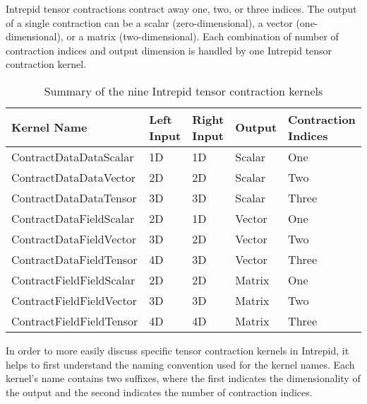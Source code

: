Intrepid tensor contractions contract away one, two, or three indices.  The
output of a single contraction can be a scalar (zero-dimensional), a vector
(one-dimensional), or a matrix (two-dimensional).  Each combination of number of
contraction indices and output dimension is handled by one Intrepid tensor
contraction kernel.

\begin{table}[ht]
        \begin{tabular} {| l | l | l | l |l |}
            \hline
            \textbf{Kernel Name} & \textbf{Left Input} & \textbf{Right Input} &
            \textbf{Output} & \textbf{Contraction Indices}\\
            \hline
            ContractDataDataScalar   & 1D & 1D & Scalar & One \\
            ContractDataDataVector   & 2D & 2D & Scalar & Two \\
            ContractDataDataTensor   & 3D & 3D & Scalar & Three \\
            ContractDataFieldScalar  & 2D & 1D & Vector & One \\
            ContractDataFieldVector  & 3D & 2D & Vector & Two \\
            ContractDataFieldTensor  & 4D & 3D & Vector & Three \\
            ContractFieldFieldScalar & 2D & 2D & Matrix & One \\
            ContractFieldFieldVector & 3D & 3D & Matrix & Two \\
            ContractFieldFieldTensor & 4D & 4D & Matrix & Three \\
            \hline
        \end{tabular}
\caption{Summary of the nine Intrepid tensor contraction kernels
\label{tab:IntrepidContractionSummary}}
\end{table}

In order to more easily discuss specific tensor contraction kernels in Intrepid,
it helps to first understand the naming convention used for the kernel names.
Each kernel's name contains two suffixes, where the first indicates the
dimensionality of the output and the second indicates the number of contraction
indices.

